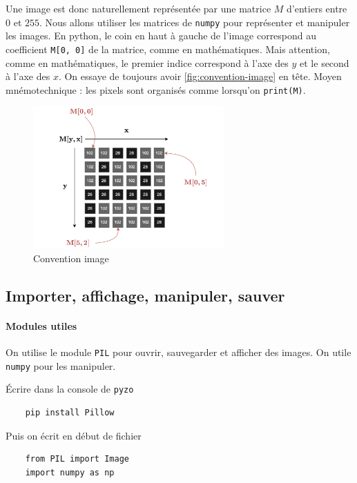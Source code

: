 Une image est donc naturellement représentée par une matrice $ M $ d'entiers entre $ 0 $ et $ 255 $. Nous allons utiliser les matrices de \texttt{numpy} pour représenter et manipuler les images. En python, le coin en haut à gauche de l'image correspond au coefficient \texttt{M[0, 0]} de la matrice, comme en mathématiques. Mais attention, comme en mathématiques, le premier indice correspond à l'axe des $ y $ et le second à l'axe des $ x $. On essaye de toujours avoir \autoref{fig:convention-image} en tête. Moyen mnémotechnique : les pixels sont organisés comme lorsqu'on \texttt{print(M)}.

\begin{figure}[h!]
    \begin{center}
        \includegraphics[width=0.65\textwidth]{figures/10/image_grise.png}
    \end{center}
    \caption{ Convention image}
    \label{fig:convention-image}
\end{figure}

\subsection*{Importer, affichage, manipuler, sauver}

\paragraph*{Modules utiles} On utilise le module \texttt{PIL} pour ouvrir, sauvegarder et afficher des images. On utile \texttt{numpy} pour les manipuler.

Écrire dans la console de \texttt{pyzo}
\begin{verbatim}
    pip install Pillow
\end{verbatim}

Puis on écrit en début de fichier 
\begin{verbatim}
    from PIL import Image
    import numpy as np
\end{verbatim}

